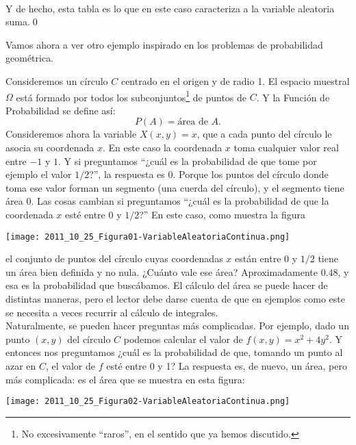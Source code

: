 \begin{itemize}
\begin{Ejemplo}
\begin{tabular}[t]{|c|c|c|c|c|c|c|c|c|c|c|c|}
        \hline
        \end{tabular}\\[3mm]
        Y de hecho, esta tabla es lo que en este caso caracteriza a la variable aleatoria suma.\qed
        \end{Ejemplo}
        Vamos ahora a ver otro ejemplo inspirado en los problemas de probabilidad geométrica.
        \begin{Ejemplo}\label{ejem:ProbabilidadGeometricaSubconjuntosCirculo}
        Consideremos un círculo $C$ centrado en el origen y de radio 1. El espacio muestral $\Omega$ está formado por todos los subconjuntos\footnote{No excesivamente ``raros'', en el sentido que ya hemos discutido.} de puntos de $C$. Y la Función de Probabilidad se define así:
        \[P(A)=\mbox{área de }A.\]
        Consideremos ahora la variable $X(x,y)=x$, que a cada punto del círculo le asocia su coordenada $x$. En este caso la coordenada $x$ toma cualquier valor real entre $-1$ y $1$. Y si preguntamos {``¿cuál es la probabilidad de que tome por ejemplo el valor $1/2$?''}, la respuesta es $0$. Porque los puntos del círculo donde toma ese valor forman un segmento (una cuerda del círculo), y el segmento tiene área $0$. Las cosas cambian si preguntamos {``¿cuál es la probabilidad de que la coordenada $x$ esté entre $0$ y $1/2$?''} En este caso, como muestra la figura
        \begin{center}
        \texttt{[image: 2011\_10\_25\_Figura01-VariableAleatoriaContinua.png]}
        \end{center}
        el conjunto de puntos del círculo cuyas coordenadas $x$ están entre $0$ y $1/2$ tiene un área bien definida y no nula. ¿Cuánto vale ese área? Aproximadamente $0.48$, y esa es la probabilidad que buscábamos. El cálculo del área se puede hacer de distintas maneras, pero el lector debe darse cuenta de que en ejemplos como este se necesita a veces recurrir al cálculo de integrales.\\
        Naturalmente, se pueden hacer preguntas más complicadas. Por ejemplo, dado un punto $(x,y)$ del círculo
         $C$ podemos calcular el valor de $f(x,y)=x^2+ 4y^2$. Y entonces nos preguntamos ¿cuál es la probabilidad de que, tomando un punto al azar en $C$, el valor de $f$ esté entre 0 y 1? La respuesta es, de nuevo, un área, pero más complicada: es el área que se muestra en esta figura:
        \begin{center}
        \texttt{[image: 2011\_10\_25\_Figura02-VariableAleatoriaContinua.png]}
        \end{center}

\end{Ejemplo}
\end{itemize}
